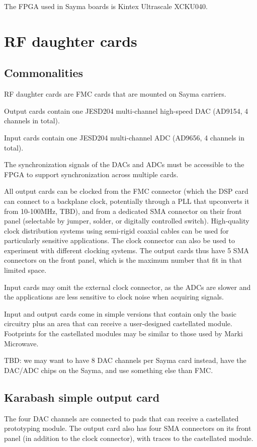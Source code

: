 \documentclass[11pt]{paper}
\begin{document}
The FPGA used in Sayma boards is Kintex Ultrascale XCKU040.

\section{RF daughter cards}
\subsection{Commonalities}
RF daughter cards are FMC cards that are mounted on Sayma carriers.

Output cards contain one JESD204 multi-channel high-speed DAC (AD9154, 4 channels in total).

Input cards contain one JESD204 multi-channel ADC (AD9656, 4 channels in total).

The synchronization signals of the DACs and ADCs must be accessible to the FPGA to support synchronization across multiple cards.

All output cards can be clocked from the FMC connector (which the DSP card can connect to a backplane clock, potentially through a PLL that upconverts it from 10-100MHz, TBD), and from a dedicated SMA connector on their front panel (selectable by jumper, solder, or digitally controlled switch). High-quality clock distribution systems using semi-rigid coaxial cables can be used for particularly sensitive applications. The clock connector can also be used to experiment with different clocking systems. The output cards thus have 5 SMA connectors on the front panel, which is the maximum number that fit in that limited space.

Input cards may omit the external clock connector, as the ADCs are slower and the applications are less sensitive to clock noise when acquiring signals.

Input and output cards come in simple versions that contain only the basic circuitry plus an area that can receive a user-designed castellated module. Footprints for the castellated modules may be similar to those used by Marki Microwave.

TBD: we may want to have 8 DAC channels per Sayma card instead, have the DAC/ADC chips on the Sayma, and use something else than FMC.

\subsection{Karabash simple output card}
The four DAC channels are connected to pads that can receive a castellated prototyping module. The output card also has four SMA connectors on its front panel (in addition to the clock connector), with traces to the castellated module.
\end{document}
